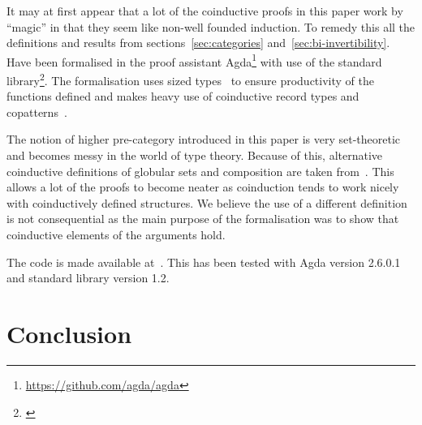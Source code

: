 \documentclass{article}
\theoremstyle{definition}
\theoremstyle{remark}
\begin{document}
It may at first appear that a lot of the coinductive proofs in this paper work by ``magic'' in that they seem like non-well founded induction. To remedy this all the definitions and results from  sections~\ref{sec:categories} and~\ref{sec:bi-invertibility}. Have been formalised in the proof assistant Agda\footnote{\url{https://github.com/agda/agda}} with use of the standard library\footnote{\url{}}. The formalisation uses sized types~\cite{Abel_2010} to ensure productivity of the functions defined and makes heavy use of coinductive record types and copatterns~\cite{10.1145/2480359.2429075}.

The notion of higher pre-category introduced in this paper is very set-theoretic and becomes messy in the world of type theory. Because of this, alternative coinductive definitions of globular sets and composition are taken from~\cite{hirschowitz_et_al:LIPIcs:2015:5166}. This allows a lot of the proofs to become neater as coinduction tends to work nicely with coinductively defined structures. We believe the use of a different definition is not consequential as the main purpose of the formalisation was to show that coinductive elements of the arguments hold.

The code is made available at~\cite{rice_agda}. This has been tested with Agda version 2.6.0.1 and standard library version 1.2.




\section{Conclusion}\label{sec:conclusion}


\printbibliography{}
\end{document}
